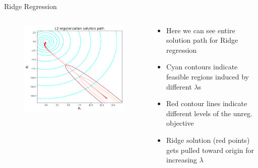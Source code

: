 \documentclass[11pt,compress,t,notes=noshow, xcolor=table]{beamer}
\begin{document}
\begin{vbframe}{Ridge Regression}
\framebreak

\begin{columns}
\begin{column}{0.5\textwidth}
\lz
\begin{figure}
\includegraphics[width=\textwidth]{slides/regularization/figure_man/solution-path-ridge-only.png}
\end{figure}
\end{column}

\begin{column}{0.5\textwidth}
\lz
\begin{footnotesize} 
\begin{itemize}
    \item Here we can see entire solution path for Ridge regression
    \item Cyan contours indicate feasible regions induced by different $\lambda$s
    \item Red contour lines indicate different levels of the unreg. objective
    \item Ridge solution (red points) gets pulled toward origin for increasing $\lambda$
\end{itemize}
\end{footnotesize}
\end{column}
\end{columns}

\end{vbframe}
\end{document}
